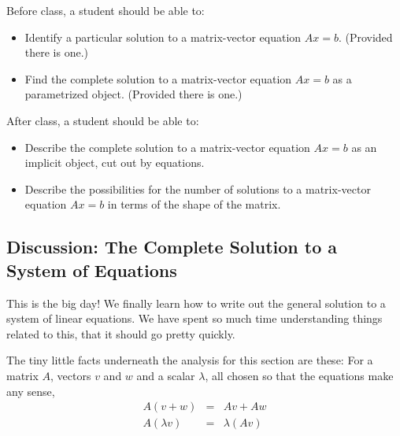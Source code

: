 \documentclass[10pt,]{book}
\theoremstyle{plain}
\theoremstyle{definition}
\numberwithin{equation}{section}
\begin{document}
      Before class, a student should be able to:
\begin{itemize}
\item{}
        Identify a particular solution to a matrix-vector equation \(Ax=b\).
        (Provided there is one.)
      \item{}
        Find the complete solution to a matrix-vector equation \(Ax=b\)
        as a parametrized object. (Provided there is one.)
      \end{itemize}
\par

      After class, a student should be able to:
\begin{itemize}
\item{}
        Describe the complete solution to a matrix-vector equation \(Ax=b\)
        as an implicit object, cut out by equations.
      \item{}
        Describe the possibilities for the number of solutions to a matrix-vector
        equation \(Ax=b\) in terms of the shape of the matrix.
      \end{itemize}
\typeout{************************************************}
\typeout{************************************************}
\subsection[
      Discussion: The Complete Solution to a System of Equations
    ]{
      Discussion: The Complete Solution to a System of Equations
    }\label{subsection-75}

      This is the big day! We finally learn how to write out the general
      solution to a system of linear equations. We have spent so much time
      understanding things related to this, that it should go pretty quickly.
\par

      The tiny little facts underneath the analysis for this section are
      these: For a matrix \(A\), vectors \(v\) and \(w\) and a scalar
      \(\lambda\), all chosen so that the equations make any sense,
      \[
        \begin{array}{rcl}
        A(v+w) &= &Av + Aw \\
        A(\lambda v) &= &\lambda ( Av )
        \end{array}
      \]
\par
\end{document}
